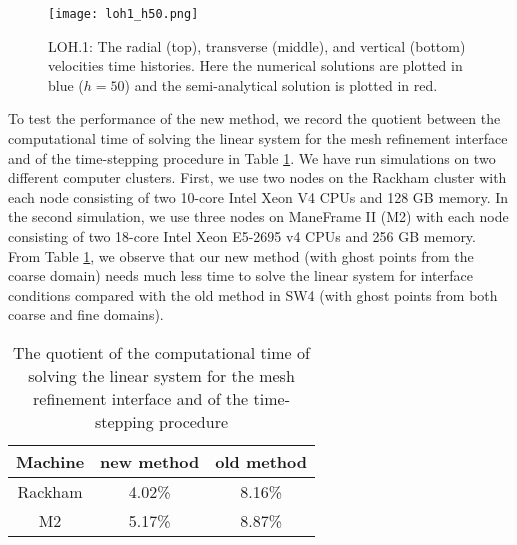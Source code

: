 \begin{figure}[htbp]
	\centering
	\texttt{[image: loh1\_h50.png]}
	\caption{LOH.1: The radial (top), transverse (middle), and vertical (bottom) velocities time histories. Here the numerical solutions are plotted in blue ($h = 50$) and the semi-analytical solution is plotted in red.}\label{loh1_50}
\end{figure}

To test the performance of the new method, we record the quotient between the computational time of solving the linear system for the mesh refinement interface and of the time-stepping procedure in Table \ref{time}. We have run simulations on two different computer clusters. First, we use two nodes on the Rackham cluster with each node consisting of two 10-core Intel Xeon V4 CPUs and 128 GB memory. In the second simulation, we use three nodes on ManeFrame II (M2) with each node consisting of two 18-core Intel Xeon E5-2695 v4 CPUs and 256 GB memory. From Table \ref{time}, we observe that our new method (with ghost points from the coarse domain) needs much less time to solve the linear system for interface conditions compared with the old method in SW4 (with ghost points from both coarse and fine domains).

\begin{table}[htbp]
	\begin{center}
		\begin{tabular}{|c|c|c|}
			\hline
			Machine   & new method & old method \\
			\hline
			Rackham & 4.02\% &  8.16\%\\
			\hline
			M2 &5.17\% & 8.87\%\\
			\hline 
		\end{tabular}
	\end{center}
		\caption{The quotient of the computational time of solving the linear system for the mesh refinement interface and of the time-stepping procedure}\label{time}
\end{table} 



